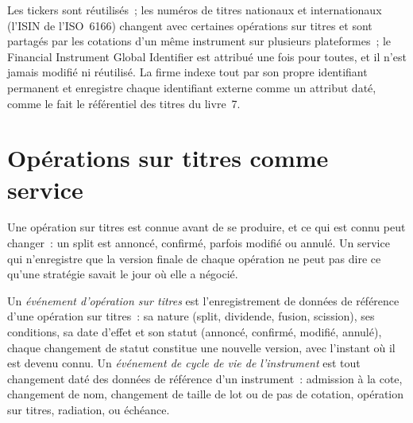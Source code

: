 \begin{remark}\label{rem:pl:reference-data-and-symbology-services:keys}
Les tickers sont réutilisés~; les numéros de titres nationaux et internationaux (l'ISIN de l'ISO~6166) changent avec certaines opérations sur titres et
sont partagés par les cotations d'un même instrument sur plusieurs plateformes~; le Financial Instrument Global Identifier est attribué une fois pour toutes, et il n'est jamais
modifié ni réutilisé. La firme indexe tout par son propre identifiant permanent et enregistre chaque identifiant externe comme un attribut daté,
comme le fait le référentiel des titres du livre~7.
\end{remark}

\section{Opérations sur titres comme service}

Une opération sur titres est connue avant de se produire, et ce qui est connu peut changer~: un split est annoncé, confirmé, parfois modifié
ou annulé. Un service qui n'enregistre que la version finale de chaque opération ne peut pas dire ce qu'une stratégie savait le jour où elle a négocié.

\begin{definition}\label{def:pl:reference-data-and-symbology-services:event}
Un \emph{événement d'opération sur titres} est l'enregistrement de données de référence d'une opération sur titres~: sa nature
(split, dividende, fusion, scission), ses conditions, sa date d'effet et son statut (annoncé, confirmé, modifié, annulé), chaque
changement de statut constitue une nouvelle version, avec l'instant où il est devenu connu. Un \emph{événement de cycle de vie de l'instrument}
est tout changement daté des données de référence d'un instrument~: admission à la cote, changement de nom, changement de taille de lot ou de pas de cotation, opération sur titres, radiation,
ou échéance.
\end{definition}

\label{lst:pl:reference-data-and-symbology-services:actions}

